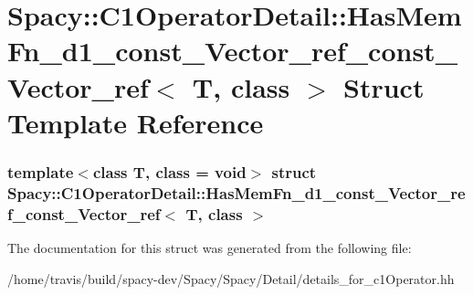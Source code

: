 \hypertarget{structSpacy_1_1C1OperatorDetail_1_1HasMemFn__d1__const__Vector__ref__const__Vector__ref}{\section{\-Spacy\-:\-:\-C1\-Operator\-Detail\-:\-:\-Has\-Mem\-Fn\-\_\-d1\-\_\-const\-\_\-\-Vector\-\_\-ref\-\_\-const\-\_\-\-Vector\-\_\-ref$<$ \-T, class $>$ \-Struct \-Template \-Reference}
\label{structSpacy_1_1C1OperatorDetail_1_1HasMemFn__d1__const__Vector__ref__const__Vector__ref}
}
\subsubsection*{template$<$class T, class = void$>$ struct Spacy\-::\-C1\-Operator\-Detail\-::\-Has\-Mem\-Fn\-\_\-d1\-\_\-const\-\_\-\-Vector\-\_\-ref\-\_\-const\-\_\-\-Vector\-\_\-ref$<$ T, class $>$}



\-The documentation for this struct was generated from the following file\-:\begin{DoxyCompactItemize}
\item 
/home/travis/build/spacy-\/dev/\-Spacy/\-Spacy/\-Detail/details\-\_\-for\-\_\-c1\-Operator.\-hh\end{DoxyCompactItemize}
